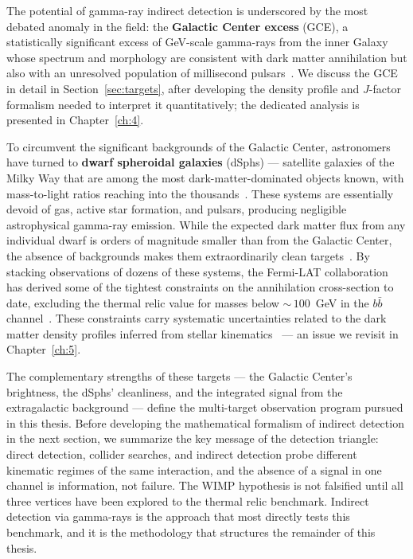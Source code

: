 The potential of gamma-ray indirect detection is underscored by the most debated anomaly in the field: the \textbf{Galactic Center excess} (GCE), a statistically significant excess of GeV-scale gamma-rays from the inner Galaxy whose spectrum and morphology are consistent with dark matter annihilation but also with an unresolved population of millisecond pulsars~\cite{Daylan:2014rsa,Cirelli:2024ssz}.
We discuss the GCE in detail in Section~\ref{sec:targets}, after developing the density profile and $J$-factor formalism needed to interpret it quantitatively; the dedicated analysis is presented in Chapter~\ref{ch:4}.

To circumvent the significant backgrounds of the Galactic Center, astronomers have turned to \textbf{dwarf spheroidal galaxies} (dSphs) --- satellite galaxies of the Milky Way that are among the most dark-matter-dominated objects known, with mass-to-light ratios reaching into the thousands~\cite{Cirelli:2024ssz,Pinetti:2021jjs}.
These systems are essentially devoid of gas, active star formation, and pulsars, producing negligible astrophysical gamma-ray emission.
While the expected dark matter flux from any individual dwarf is orders of magnitude smaller than from the Galactic Center, the absence of backgrounds makes them extraordinarily clean targets~\cite{Hooper:2024}.
By stacking observations of dozens of these systems, the Fermi-LAT collaboration has derived some of the tightest constraints on the annihilation cross-section to date, excluding the thermal relic value for masses below ${\sim}\,100$~GeV in the $b\bar{b}$ channel~\cite{Fermi-LAT:2015att,Hooper:2024}.
These constraints carry systematic uncertainties related to the dark matter density profiles inferred from stellar kinematics~\cite{Bonnivard:2015xpq} --- an issue we revisit in Chapter~\ref{ch:5}.

The complementary strengths of these targets --- the Galactic Center's brightness, the dSphs' cleanliness, and the integrated signal from the extragalactic background --- define the multi-target observation program pursued in this thesis.
Before developing the mathematical formalism of indirect detection in the next section, we summarize the key message of the detection triangle: direct detection, collider searches, and indirect detection probe different kinematic regimes of the same interaction, and the absence of a signal in one channel is information, not failure.
The WIMP hypothesis is not falsified until all three vertices have been explored to the thermal relic benchmark.
Indirect detection via gamma-rays is the approach that most directly tests this benchmark, and it is the methodology that structures the remainder of this thesis.
